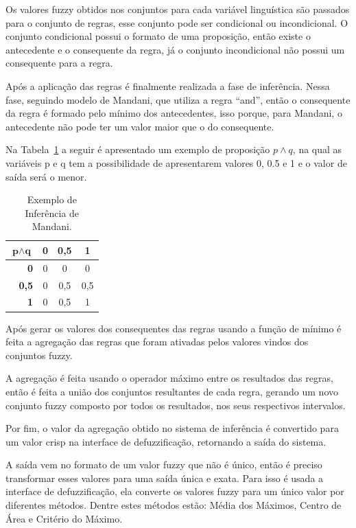 \documentclass[
	article,			%
	11pt,				%
	oneside,			%
	a4paper,			%
	english,			%
	brazil,				%
	sumario=tradicional
	]{abntex2}
\begin{document}
\begin{multicols}{2}
Os valores fuzzy obtidos nos conjuntos para cada variável linguística são passados para o conjunto de regras, esse conjunto pode ser condicional ou incondicional. O conjunto condicional possui o formato de uma proposição, então existe o antecedente e o consequente da regra, já o conjunto incondicional não possui um consequente para a regra.

Após a aplicação das regras é finalmente realizada a fase de inferência. Nessa fase, seguindo modelo de Mandani, que utiliza a regra “and”, então o consequente da regra é formado pelo mínimo dos antecedentes, isso porque, para Mandani, o antecedente não pode ter um valor maior que o do consequente.

Na Tabela~\ref{tab:exMandani} a seguir é apresentado um exemplo de proposição $p\wedge q$, na qual as variáveis p e q  tem a possibilidade de apresentarem valores 0, 0.5 e 1 e o valor de saída será o menor.

\begin{table}[H]
  \centering
  \begin{tabular}{|r|c|c|c|}
    \hline 
    $\textbf{p} \wedge \textbf{q}$ & \textbf{0} & \textbf{0,5} & \textbf{1} \\ 
    \hline 
    \textbf{0} & 0 & 0 & 0 \\ 
    \hline 
    \textbf{0,5} & 0 & 0,5 & 0,5 \\ 
    \hline 
    \textbf{1} & 0 & 0,5 & 1 \\ 
    \hline 
  \end{tabular} 
  \caption{Exemplo de Inferência de Mandani.}
  \label{tab:exMandani}
  \vspace{-0.5cm}
\end{table}

Após gerar os valores dos consequentes das regras usando a função de mínimo é feita a agregação das regras que foram ativadas pelos valores vindos dos conjuntos fuzzy.

A agregação é feita usando o operador máximo entre os resultados das regras, então é feita a união dos conjuntos resultantes de cada regra, gerando um novo conjunto fuzzy composto por todos os resultados, nos seus respectivos intervalos.

Por fim, o valor da agregação obtido no sistema de inferência é convertido para um valor crisp na interface de defuzzificação, retornando a saída do sistema.

A saída vem no formato de um valor fuzzy que não é único, então é preciso transformar esses valores para uma saída única e exata. Para isso é usada a interface de defuzzificação, ela converte os valores fuzzy para um único valor por diferentes métodos. Dentre estes métodos estão: Média dos Máximos, Centro de Área e Critério do Máximo.



\end{multicols}
\end{document}
